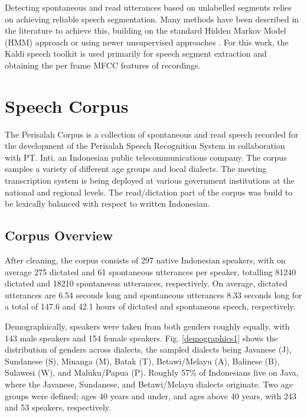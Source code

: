 \documentclass[conference]{IEEEtran}
\begin{document}
Detecting spontaneous and read utterances based on unlabelled segments relies on achieving reliable speech segmentation.
Many methods have been described in the literature to achieve this, building on the standard Hidden Markov Model (HMM) approach or using newer unsupervised approaches \cite{scharenborg}.
For this work, the Kaldi speech toolkit \cite{povey} is used primarily for speech segment extraction and obtaining the per frame MFCC features of recordings.

\section{Speech Corpus}

The Perisalah Corpus is a collection of spontaneous and read speech recorded for the development of the Perisalah Speech Recognition System in collaboration with PT. Inti, an Indonesian public telecommunications company.
The corpus samples a variety of different age groups and local dialects.
The meeting transcription system is being deployed at various government institutions at the national and regional levels.
The read/dictation part of the corpus was build to be lexically balanced with respect to written Indonesian.

\subsection{Corpus Overview}

After cleaning, the corpus consists of 297 native Indonesian speakers, with on average 275 dictated and 61 spontaneous utterances per speaker, totalling 81240 dictated and 18210 spontaneous utterances, respectively.
On average, dictated utterances are 6.54 seconds long and spontaneous utterances 8.33 seconds long for a total of 147.6 and 42.1 hours of dictated and spontaneous speech, respectively.

Demographically, speakers were taken from both genders roughly equally, with 143 male speakers and 154 female speakers.
Fig. \ref{demographics1} shows the distribution of genders across dialects, the sampled dialects being Javanese (J), Sundanese (S), Minanga (M), Batak (T), Betawi/Melayu (A), Balinese (B), Sulawesi (W), and Maluku/Papua (P).
Roughly 57\% of Indonesians live on Java, where the Javanese, Sundanese, and Betawi/Melayu dialects originate.
Two age groups were defined; ages 40 years and under, and ages above 40 years, with 243 and 53 speakers, respectively.
\end{document}
